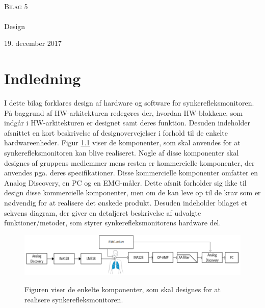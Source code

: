 

\begin{titlingpage}
\begin{center}

~ \\[3cm]

\textsc{\LARGE Bilag 5}\\[1.5cm]


\noindent\makebox[\linewidth]{\rule{\textwidth}{0.4pt}}\\
[0.5cm]{\Huge Design}
\noindent\makebox[\linewidth]{\rule{\textwidth}{0.4pt}}
\end{center}
\vfill
\begin{center}
{\large 19. december 2017}
\end{center}
\end{titlingpage}

\newpage
\tableofcontents*
\newpage

\chapter{Indledning}
I dette bilag forklares design af hardware og software  for synkerefleksmonitoren. På baggrund af HW-arkitekturen redegøres der, hvordan HW-blokkene, som indgår i HW-arkitekturen er designet samt deres funktion. Desuden indeholder afsnittet en kort beskrivelse af designovervejelser i forhold til de enkelte hardwareenheder. Figur \ref{blokflow} viser de komponenter, som skal anvendes for at synkerefleksmonitoren kan blive realiseret. Nogle af disse komponenter skal designes af gruppens medlemmer mens  resten er kommercielle komponenter, der anvendes pga. deres specifikationer. Disse kommercielle komponenter omfatter en Analog Discovery, en PC og en EMG-måler. Dette afsnit forholder sig ikke til design disse kommercielle komponenter, men om de kan leve op til de krav som er nødvendig for at realisere det ønskede produkt. Desuden indeholder bilaget et sekvens diagram, der  giver en detaljeret beskrivelse af udvalgte funktioner/metoder, som styrer synkerefleksmonitorens hardware del.   

\begin{figure}[H]
\centering
{\includegraphics[width=\linewidth]
{Figure/Blokaede}}
\caption{Figuren viser de enkelte komponenter, som skal designes for at realisere synkerefleksmonitoren.}
\label{blokflow}
\end{figure}


